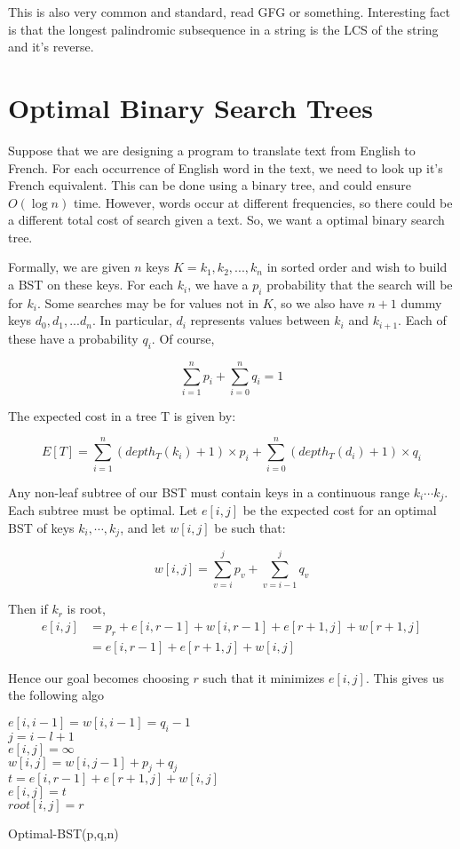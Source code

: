 \documentclass[12pt,letterpaper]{article}
\theoremstyle{definition}
\begin{document}
This is also very common and standard, read GFG or something. Interesting fact is that the longest palindromic subsequence in a string is the LCS of the string and it's reverse.

\section{Optimal Binary Search Trees}

Suppose that we are designing a program to translate text from English to French. For each occurrence of English word in the text, we need to look up it's French equivalent. This can be done using a binary tree, and could ensure $O(\log n)$ time. However, words occur at different frequencies, so there could be a different total cost of search given a text. So, we want a optimal binary search tree.

Formally, we are given $n$ keys $K = k_1,k_2,...,k_n$ in sorted order and wish to build a BST on these keys. For each $k_i$, we have a $p_i$ probability that the search will be for $k_i$. Some searches may be for values not in $K$, so we also have $n+1$ dummy keys $d_0,d_1,...d_n$. In particular, $d_i$ represents values between $k_i$ and $k_{i+1}$. Each of these have a probability $q_i$. Of course,

\[\sum_{i=1}^n p_i + \sum_{i=0}^n q_i = 1\]

The expected cost in a tree T is given by:

\[E[T] = \sum_{i=1}^n (depth_{T}(k_i) + 1) \times p_i + \sum_{i=0}^n (depth_{T}(d_i) + 1)\times q_i \]

Any non-leaf subtree of our BST must contain keys in a continuous range $k_i \cdots k_j$. Each subtree must be optimal. Let $e[i,j]$ be the expected cost for an optimal BST of keys $k_i,\cdots,k_j$, and let $w[i,j]$ be such that:

\[w[i,j] = \sum_{v=i}^j p_v + \sum_{v=i-1}^j q_v\]

Then if $k_r$ is root,
\begin{align*}
  e[i,j] &=  p_r + e[i,r-1] + w[i,r-1] + e[r+1,j] + w[r+1,j] \\
         &= e[i,r-1] + e[r+1,j] + w[i,j]
\end{align*}

Hence our goal becomes choosing $r$ such that it minimizes $e[i,j]$. This gives us the following algo

\begin{algorithm}[H]
  \SetAlgoLined
   {
    $e[i,i-1] = w[i,i-1] = q_i-1$ \\
  }
   {
     {
      $j = i-l+1$ \\
      $e[i,j] = \infty$ \\ 
      $w[i,j] = w[i,j-1] + p_j + q_j$ \\
       {
        $t = e[i,r-1] + e[r+1,j] + w[i,j]$ \\
         {
          $e[i,j] = t$ \\
          $root[i,j] = r$
        }
      }
    }
  }
  \caption{Optimal-BST(p,q,n)}
\end{algorithm}
\end{document}
